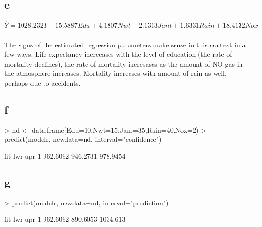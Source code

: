 \documentclass{article}
\begin{document}
\subsection*{e}
$\hat{Y}=1028.2323-15.5887Edu+4.1807Nwt-2.1313Jant+1.6331Rain+18.4132Nox$
\\\\
The signs of the estimated regression parameters make sense in this context in a few ways. Life expectancy increeases with the level of education (the rate of mortality declines), the rate of mortality incresases as the amount of NO gas in the atmosphere increases. Mortality increases with amount of rain as well, perhaps due to accidents.  

\subsection*{f}
\begin{Schunk}
\begin{Sinput}
> nd <- data.frame(Edu=10,Nwt=15,Jant=35,Rain=40,Nox=2)
> predict(modelr, newdata=nd, interval="confidence")
\end{Sinput}
\begin{Soutput}
       fit      lwr      upr
1 962.6092 946.2731 978.9454
\end{Soutput}
\end{Schunk}

\subsection*{g}
\begin{Schunk}
\begin{Sinput}
> predict(modelr, newdata=nd, interval="prediction")
\end{Sinput}
\begin{Soutput}
       fit      lwr      upr
1 962.6092 890.6053 1034.613
\end{Soutput}
\end{Schunk}
\end{document}
